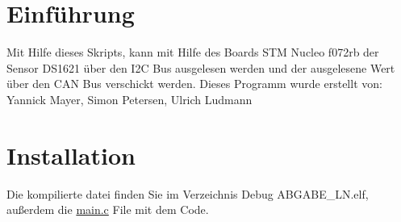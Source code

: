 \hypertarget{index_intro_sec}{}\section{Einführung}\label{index_intro_sec}
Mit Hilfe dieses Skripts, kann mit Hilfe des Boards S\+TM Nucleo f072rb der Sensor D\+S1621 über den I2C Bus ausgelesen werden und der ausgelesene Wert über den C\+AN Bus verschickt werden. Dieses Programm wurde erstellt von\+: Yannick Mayer, Simon Petersen, Ulrich Ludmann \hypertarget{index_install_sec}{}\section{Installation}\label{index_install_sec}
Die kompilierte datei finden Sie im Verzeichnis Debug A\+B\+G\+A\+B\+E\+\_\+\+L\+N.\+elf, außerdem die \hyperlink{main_8c}{main.\+c} File mit dem Code. 